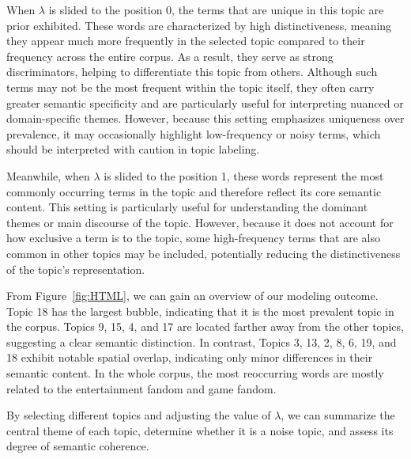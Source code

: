 \documentclass[12pt]{article}
\begin{document}
	When $\lambda$ is slided to the position 0, the terms that are unique in this topic are prior exhibited. These words are characterized by high distinctiveness, meaning they appear much more frequently in the selected topic compared to their frequency across the entire corpus. As a result, they serve as strong discriminators, helping to differentiate this topic from others. Although such terms may not be the most frequent within the topic itself, they often carry greater semantic specificity and are particularly useful for interpreting nuanced or domain-specific themes. However, because this setting emphasizes uniqueness over prevalence, it may occasionally highlight low-frequency or noisy terms, which should be interpreted with caution in topic labeling.
	
	Meanwhile, when $\lambda$ is slided to the position 1, these words represent the most commonly occurring terms in the topic and therefore reflect its core semantic content. This setting is particularly useful for understanding the dominant themes or main discourse of the topic. However, because it does not account for how exclusive a term is to the topic, some high-frequency terms that are also common in other topics may be included, potentially reducing the distinctiveness of the topic’s representation.
	 
	From Figure~\ref{fig:HTML}, we can gain an overview of our modeling outcome. Topic 18 has the largest bubble, indicating that it is the most prevalent topic in the corpus. Topics 9, 15, 4, and 17 are located farther away from the other topics, suggesting a clear semantic distinction. In contrast, Topics 3, 13, 2, 8, 6, 19, and 18 exhibit notable spatial overlap, indicating only minor differences in their semantic content. In the whole corpus, the most reoccurring words are mostly related to the entertainment fandom and game fandom.
	
	By selecting different topics and adjusting the value of $\lambda$, we can summarize the central theme of each topic, determine whether it is a noise topic, and assess its degree of semantic coherence.
	
\end{document}
